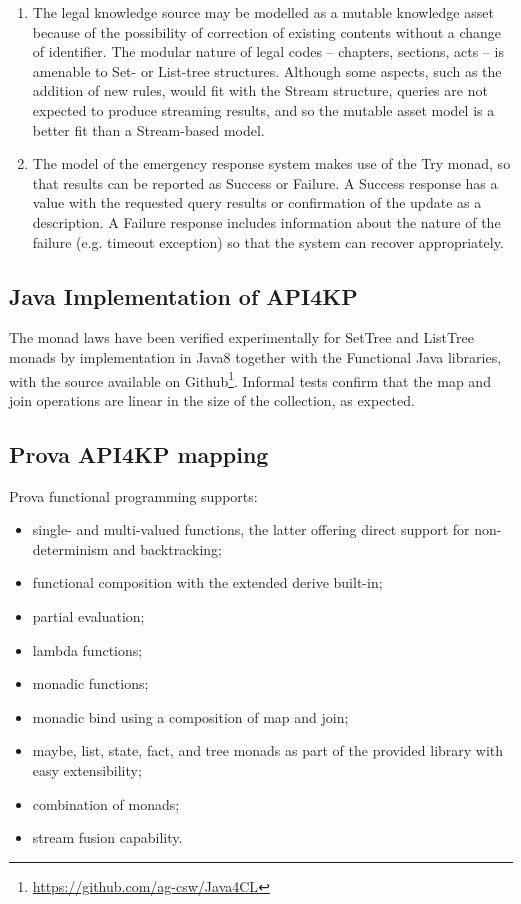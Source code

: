\documentclass[runningheads]{llncs}
\begin{document}
\begin{enumerate}
\item The legal knowledge source may be modelled as a mutable knowledge asset  because of the possibility of correction of existing contents without a change of identifier. The modular nature of legal codes -- chapters, sections, acts -- is amenable to Set- or List-tree structures. Although some aspects, such as the addition of new rules, would fit with the Stream structure, queries are not expected to produce streaming results, and so the mutable asset model is a better fit than a Stream-based model.

\item The model of the emergency response system makes use of the Try monad, so that results can be reported as Success or Failure. A Success response has a value with the requested query results or confirmation of the update as a description. A Failure response includes information about the nature of the failure (e.g. timeout exception) so that the system can recover appropriately.

\end{enumerate}

  

\subsection{Java Implementation of API4KP}

The monad laws have been verified experimentally for SetTree and ListTree monads by implementation in Java8 together with the Functional Java libraries, with the source available on Github\footnote{\url{https://github.com/ag-csw/Java4CL}}. Informal tests confirm that the map and join operations are linear in the size of the collection, as expected.



\subsection{Prova API4KP mapping}

Prova functional programming supports:

\begin{itemize}
  \item single- and multi-valued functions, the latter offering direct support for non-determinism and backtracking;
  \item functional composition with the extended derive built-in;
  \item partial evaluation;
  \item lambda functions;
  \item monadic functions;
  \item monadic bind using a composition of map and join;
  \item maybe, list, state, fact, and tree monads as part of the provided library with easy extensibility;
  \item combination of monads;
  \item stream fusion capability.
\end{itemize}
\end{document}
